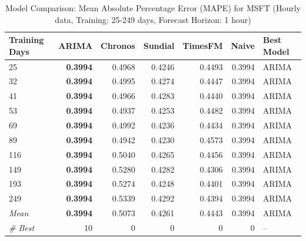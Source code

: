 \begin{table}[htbp]
\centering
\caption{Model Comparison: Mean Absolute Percentage Error (MAPE) for MSFT (Hourly data, Training: 25-249 days, Forecast Horizon: 1 hour)}
\label{tab:comparison_MSFT_1h_train-less-year-log_h1_MAPE}
\small
\begin{tabular}{lrrrrrl}
\toprule
Training Days & ARIMA & Chronos & Sundial & TimesFM & Naive & Best Model \\
\midrule
25 & \textbf{0.3994} & 0.4968 & 0.4246 & 0.4493 & 0.3994 & ARIMA \\
32 & \textbf{0.3994} & 0.4995 & 0.4274 & 0.4447 & 0.3994 & ARIMA \\
41 & \textbf{0.3994} & 0.4966 & 0.4283 & 0.4440 & 0.3994 & ARIMA \\
53 & \textbf{0.3994} & 0.4937 & 0.4253 & 0.4482 & 0.3994 & ARIMA \\
69 & \textbf{0.3994} & 0.4992 & 0.4236 & 0.4434 & 0.3994 & ARIMA \\
89 & \textbf{0.3994} & 0.4942 & 0.4230 & 0.4573 & 0.3994 & ARIMA \\
116 & \textbf{0.3994} & 0.5040 & 0.4265 & 0.4456 & 0.3994 & ARIMA \\
149 & \textbf{0.3994} & 0.5280 & 0.4282 & 0.4306 & 0.3994 & ARIMA \\
193 & \textbf{0.3994} & 0.5274 & 0.4248 & 0.4401 & 0.3994 & ARIMA \\
249 & \textbf{0.3994} & 0.5339 & 0.4292 & 0.4394 & 0.3994 & ARIMA \\
\midrule
\textit{Mean} & \textbf{0.3994} & 0.5073 & 0.4261 & 0.4443 & 0.3994 & ARIMA \\
\textit{\# Best} & 10 & 0 & 0 & 0 & 0 & -- \\
\bottomrule
\end{tabular}
\end{table}